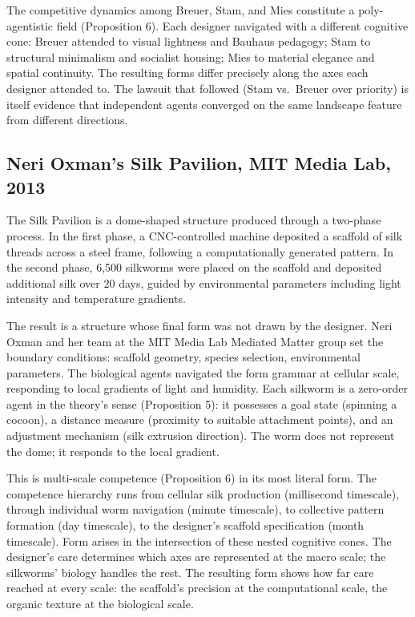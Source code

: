 The competitive dynamics among Breuer, Stam, and Mies constitute a poly-agentistic field (Proposition 6). Each designer navigated with a different cognitive cone: Breuer attended to visual lightness and Bauhaus pedagogy; Stam to structural minimalism and socialist housing; Mies to material elegance and spatial continuity. The resulting forms differ precisely along the axes each designer attended to. The lawsuit that followed (Stam vs.\ Breuer over priority) is itself evidence that independent agents converged on the same landscape feature from different directions.

\subsection{Neri Oxman's Silk Pavilion, MIT Media Lab, 2013}

The Silk Pavilion is a dome-shaped structure produced through a two-phase process. In the first phase, a CNC-controlled machine deposited a scaffold of silk threads across a steel frame, following a computationally generated pattern. In the second phase, 6,500 silkworms were placed on the scaffold and deposited additional silk over 20 days, guided by environmental parameters including light intensity and temperature gradients.

The result is a structure whose final form was not drawn by the designer. Neri Oxman and her team at the MIT Media Lab Mediated Matter group set the boundary conditions: scaffold geometry, species selection, environmental parameters. The biological agents navigated the form grammar at cellular scale, responding to local gradients of light and humidity. Each silkworm is a zero-order agent in the theory's sense (Proposition 5): it possesses a goal state (spinning a cocoon), a distance measure (proximity to suitable attachment points), and an adjustment mechanism (silk extrusion direction). The worm does not represent the dome; it responds to the local gradient.

This is multi-scale competence (Proposition 6) in its most literal form. The competence hierarchy runs from cellular silk production (millisecond timescale), through individual worm navigation (minute timescale), to collective pattern formation (day timescale), to the designer's scaffold specification (month timescale). Form arises in the intersection of these nested cognitive cones. The designer's care determines which axes are represented at the macro scale; the silkworms' biology handles the rest. The resulting form shows how far care reached at every scale: the scaffold's precision at the computational scale, the organic texture at the biological scale.


